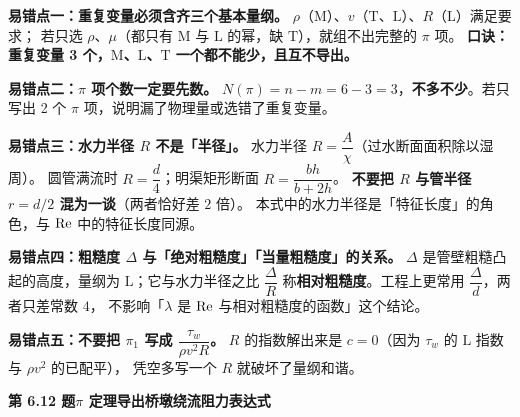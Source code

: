 \begin{yicuo}
\textbf{易错点一：重复变量必须含齐三个基本量纲。}
$\rho$（$\mathrm{M}$）、$v$（$\mathrm{T}$、$\mathrm{L}$）、$R$（$\mathrm{L}$）满足要求；
若只选 $\rho$、$\mu$（都只有 $\mathrm{M}$ 与 $\mathrm{L}$ 的幂，缺 $\mathrm{T}$），就组不出完整的 $\pi$ 项。
\textbf{口诀：重复变量 3 个，$\mathrm{M}$、$\mathrm{L}$、$\mathrm{T}$ 一个都不能少，且互不导出。}

\textbf{易错点二：$\pi$ 项个数一定要先数。}
$N(\pi)=n-m=6-3=3$，\textbf{不多不少}。若只写出 2 个 $\pi$ 项，说明漏了物理量或选错了重复变量。

\textbf{易错点三：水力半径 $R$ 不是「半径」。}
水力半径 $R=\dfrac{A}{\chi}$（过水断面面积除以湿周）。
圆管满流时 $R=\dfrac{d}{4}$；明渠矩形断面 $R=\dfrac{bh}{b+2h}$。
\textbf{不要把 $R$ 与管半径 $r=d/2$ 混为一谈}（两者恰好差 $2$ 倍）。
本式中的水力半径是「特征长度」的角色，与 $\mathrm{Re}$ 中的特征长度同源。

\textbf{易错点四：粗糙度 $\Delta$ 与「绝对粗糙度」「当量粗糙度」的关系。}
$\Delta$ 是管壁粗糙凸起的高度，量纲为 $\mathrm{L}$；它与水力半径之比 $\dfrac{\Delta}{R}$
称\textbf{相对粗糙度}。工程上更常用 $\dfrac{\Delta}{d}$，两者只差常数 $4$，
不影响「$\lambda$ 是 $\mathrm{Re}$ 与相对粗糙度的函数」这个结论。

\textbf{易错点五：不要把 $\pi_1$ 写成 $\dfrac{\tau_w}{\rho v^{2}R}$。}
$R$ 的指数解出来是 $c=0$（因为 $\tau_w$ 的 $\mathrm{L}$ 指数与 $\rho v^{2}$ 的已配平），
凭空多写一个 $R$ 就破坏了量纲和谐。
\end{yicuo}

\noindent\textbf{第 6.12 题\quad $\pi$ 定理导出桥墩绕流阻力表达式}

